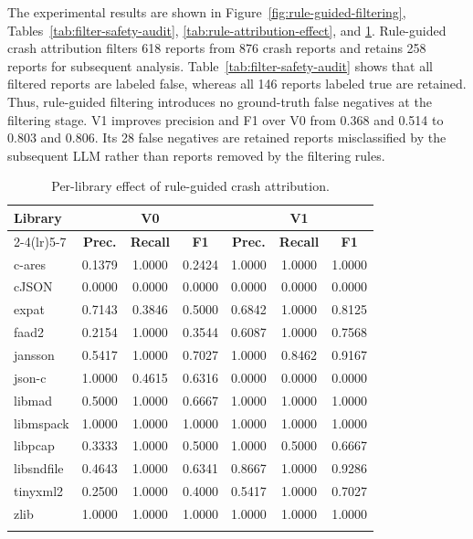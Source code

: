\documentclass[pdflatex,sn-basic]{sn-jnl}%
\renewcommand{\arraystretch}{1.16}%
\theoremstyle{thmstyleone}%
\theoremstyle{thmstyletwo}%
\theoremstyle{thmstylethree}%
\begin{document}
The experimental results are shown in Figure~\ref{fig:rule-guided-filtering}, Tables~\ref{tab:filter-safety-audit}, \ref{tab:rule-attribution-effect}, and \ref{tab:per-library-rule-attribution}. Rule-guided crash attribution filters 618 reports from 876 crash reports and retains 258 reports for subsequent analysis. Table~\ref{tab:filter-safety-audit} shows that all filtered reports are labeled false, whereas all 146 reports labeled true are retained. Thus, rule-guided filtering introduces no ground-truth false negatives at the filtering stage. V1 improves precision and F1 over V0 from 0.368 and 0.514 to 0.803 and 0.806. Its 28 false negatives are retained reports misclassified by the subsequent LLM rather than reports removed by the filtering rules.

\begin{table}[ht]
\caption{Per-library effect of rule-guided crash attribution.}
\label{tab:per-library-rule-attribution}
\centering
\scriptsize
\setlength{\tabcolsep}{2.2pt}
\renewcommand{\arraystretch}{1.08}
\begin{tabular*}{\linewidth}{@{\extracolsep{\fill}}lcccccc}
\toprule
\textbf{Library} & \multicolumn{3}{c}{\textbf{V0}} & \multicolumn{3}{c}{\textbf{V1}} \\
\cmidrule(lr){2-4}\cmidrule(lr){5-7}
& \textbf{Prec.} & \textbf{Recall} & \textbf{F1} & \textbf{Prec.} & \textbf{Recall} & \textbf{F1} \\
\midrule
c-ares & 0.1379 & 1.0000 & 0.2424 & 1.0000 & 1.0000 & 1.0000 \\
cJSON & 0.0000 & 0.0000 & 0.0000 & 0.0000 & 0.0000 & 0.0000 \\
expat & 0.7143 & 0.3846 & 0.5000 & 0.6842 & 1.0000 & 0.8125 \\
faad2 & 0.2154 & 1.0000 & 0.3544 & 0.6087 & 1.0000 & 0.7568 \\
jansson & 0.5417 & 1.0000 & 0.7027 & 1.0000 & 0.8462 & 0.9167 \\
json-c & 1.0000 & 0.4615 & 0.6316 & 0.0000 & 0.0000 & 0.0000 \\
libmad & 0.5000 & 1.0000 & 0.6667 & 1.0000 & 1.0000 & 1.0000 \\
libmspack & 1.0000 & 1.0000 & 1.0000 & 1.0000 & 1.0000 & 1.0000 \\
libpcap & 0.3333 & 1.0000 & 0.5000 & 1.0000 & 0.5000 & 0.6667 \\
libsndfile & 0.4643 & 1.0000 & 0.6341 & 0.8667 & 1.0000 & 0.9286 \\
tinyxml2 & 0.2500 & 1.0000 & 0.4000 & 0.5417 & 1.0000 & 0.7027 \\
zlib & 1.0000 & 1.0000 & 1.0000 & 1.0000 & 1.0000 & 1.0000 \\
\botrule
\end{tabular*}
\end{table}
\FloatBarrier
\end{document}
